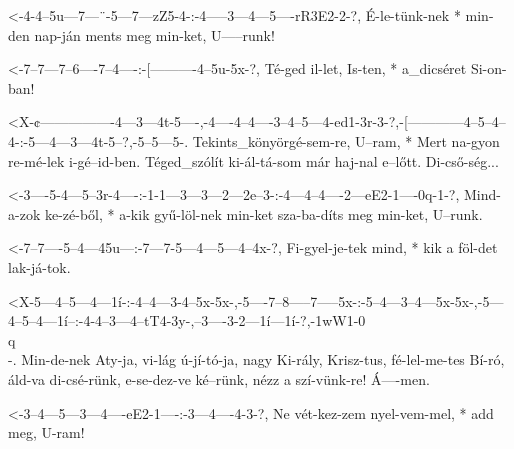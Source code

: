   {<-4-4--5u---7---¨-5---7---zZ5-4-:-4-----3---4---5----rR3E2-2-?,}
  {  É-le-tünk-nek * min-den nap-ján ments meg min-ket, U-----runk!}

  {<-7--7---7--6----7--4----:-[----------4--5u-5x-?,}
  {  Té-ged il-let, Is-ten, * a_dicséret Si-on-ban!}

  {<X-¢----------------4---3---4t-5----,-4----4--4----3--4--5---4-ed1-3r-3-?,-[------------4--5--4--4-:-5---4---3---4t-5--?,-5--5---5-.}
  {   Tekints_könyörgé-sem-re, U--ram, * Mert na-gyon re-mé-lek i-gé--id-ben. Téged_szólít ki-ál-tá-som már haj-nal e--lőtt. Di-cső-ség...}

  {<-3----5-4---5--3r-4----:-1-1---3---3---2---2e--3-:-4---4--4----2---eE2-1----0q-1-?,}
  {  Mind-a-zok ke-zé-ből, * a-kik gyű-löl-nek min-ket sza-ba-díts meg min-ket, U--runk.}



  {<-7--7----5--4---45u---:-7---7-5---4---5---4--4x-?,}
  {  Fi-gyel-je-tek mind, * kik a föl-det lak-já-tok.}



  {<X-5---4--5---4---1í-:-4--4---3-4--5x-5x-,-5----7--8-----7-----5x-:-5--4---3--4---5x-5x-,-5---4--5--4---1í--:-4-4--3---4--tT4-3y-,--3----3-2---1í---1í-?,-1wW1-0\\q\\-.}
  {   Min-de-nek Aty-ja,  vi-lág ú-jí-tó-ja,  nagy Ki-rály, Krisz-tus, fé-lel-me-tes Bí-ró,  áld-va di-csé-rünk, e-se-dez-ve ké--rünk, nézz a szí-vünk-re!   Á----men.}

  {<-3--4---5---3---4----eE2-1----:-3---4----4-3-?,}
  {  Ne vét-kez-zem nyel-vem-mel, * add meg, U-ram!}

